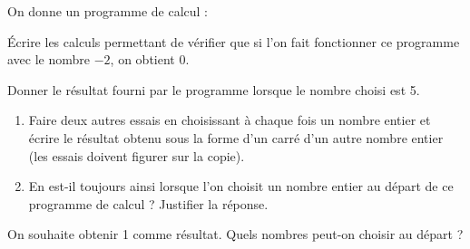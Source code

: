 On donne un programme de calcul :
  \begin{center}
  \end{center}
  \begin{myenumerate}
    \item\'Ecrire les calculs permettant de vérifier que si l'on fait fonctionner ce programme avec le nombre $-2$, on obtient 0.
    \item Donner le résultat fourni par le programme lorsque le nombre choisi est 5.
    \item
      \begin{enumerate}
      \item Faire deux autres essais en choisissant à chaque fois un nombre entier et écrire le résultat obtenu sous la forme d'un carré d'un autre nombre entier (les essais doivent figurer sur la copie).
      \item En est-il toujours ainsi lorsque l'on choisit un nombre entier au départ de ce programme de calcul ? Justifier la réponse.
      \end{enumerate}
    \item On souhaite obtenir 1 comme résultat. Quels nombres peut-on choisir au départ ?
  \end{myenumerate}
